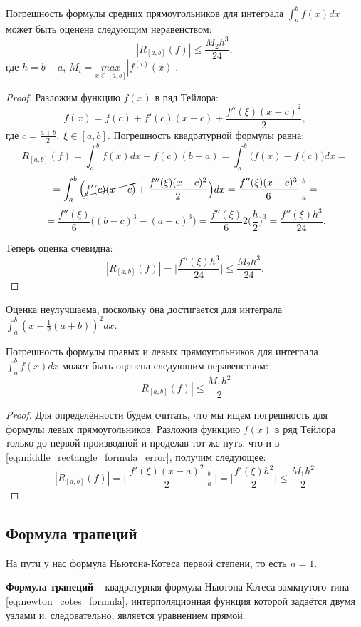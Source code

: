 \documentclass[../main.tex]{subfile}
\begin{document}
\begin{theorem}
\label{eq:middle_rectangle_formula_error}
	Погрешность формулы средних прямоугольников для интеграла $\int_a^b
	f(x)dx$ может быть оценена следующим неравенством:
	\[\boxed{|R_{[a,b]}(f)|\le\frac{M_2h^3}{24}},\]
	где $h=b-a$, $M_i=\underset{x\in[a,b]}{max}|f^{(i)}(x)|.$
\end{theorem}

\begin{proof}
	Разложим функцию $f(x)$ в ряд Тейлора:
	\[f(x)=f(c)+f'(c)(x-c)+\frac{f''(\xi)(x-c)^2}{2},\]
	где $c=\frac{a+b}{2},\;\xi\in[a,b].$ Погрешность квадратурной формулы
	равна:
	\[R_{[a,b]}(f)=\int_a^b f(x)dx - f(c)(b-a)=\int_a^b\big(f(x) - f(c)\big)
	dx=\]
	\[=\int_a^b \Big(\cancel{f'(c)(x-c)}+\frac{f''(\xi)(x-c)^2}{2}\Big)dx=
	\frac{f''(\xi)(x-c)^3}{6}\Big|_a^b=\]
	\[=\frac{f''(\xi)}{6}\Big((b-c)^3-(a-c)^3\Big)=\frac{f''(\xi)}{6}2\Big(
	\frac{h}{2}\Big)^3=\frac{f''(\xi)h^3}{24}.\]

	Теперь оценка очевидна:
	\[|R_{[a,b]}(f)|=\Big|\frac{f''(\xi)h^3}{24}\Big|\le\frac{M_2h^3}{24}.\]
\end{proof}

Оценка неулучшаема, поскольку она достигается для интеграла\\
$\int_a^b(x-\frac{1}{2}(a+b))^2dx$.

\begin{theorem}
	Погрешность формулы правых и левых прямоугольников для интеграла
	$\int_a^b f(x)dx$ может быть оценена следующим неравенством:
	\[\boxed{|R_{[a,b]}(f)|\le\frac{M_1h^2}{2}}\]
\end{theorem}

\begin{proof}
	Для определённости будем считать, что мы ищем погрешность для формулы
	левых прямоугольников. Разложив функцию $f(x)$ в ряд Тейлора только до
	первой производной и проделав тот же путь, что и в
	\eqref{eq:middle_rectangle_formula_error}, получим следующее:
	\[|R_{[a,b]}(f)|=\Big|\;\frac{f'(\xi)(x-a)^2}{2}\Big|_a^b\;\Big|=
	\Big|\frac{f'(\xi)h^2}{2}\Big|\le\frac{M_1h^2}{2}\]
\end{proof}

\subsection{Формула трапеций}
На пути у нас формула Ньютона-Котеса первой степени, то есть $n=1$.

\begin{define}
	\textbf{Формула трапеций} -- квадратурная формула Ньютона-Котеса
	замкнутого типа \eqref{eq:newton_cotes_formula}, интерполяционная
	функция которой задаётся двумя узлами и, следовательно, является
	уравнением прямой.
\end{define}
\end{document}
